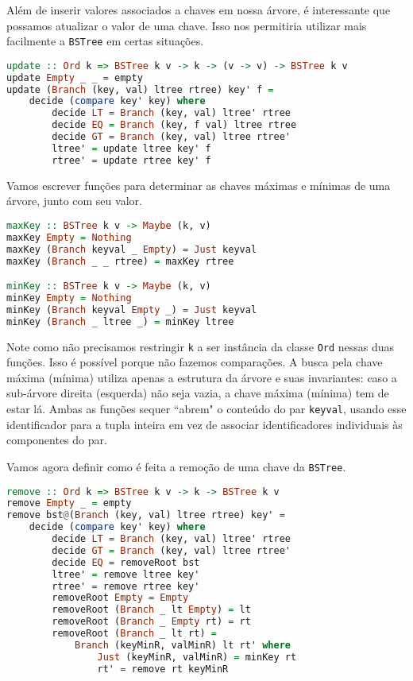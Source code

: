 \documentclass[a4paper]{article}
\begin{document}
Além de inserir valores associados a chaves em nossa árvore, é interessante que possamos atualizar o valor de uma chave.
Isso nos permitiria utilizar mais facilmente a \texttt{BSTree} em certas situações.

\begin{lstlisting}[language=haskell, frame=single]
update :: Ord k => BSTree k v -> k -> (v -> v) -> BSTree k v
update Empty _ _ = empty
update (Branch (key, val) ltree rtree) key' f =
	decide (compare key' key) where
		decide LT = Branch (key, val) ltree' rtree
		decide EQ = Branch (key, f val) ltree rtree
		decide GT = Branch (key, val) ltree rtree'
		ltree' = update ltree key' f
		rtree' = update rtree key' f
\end{lstlisting}

Vamos escrever funções para determinar as chaves máximas e mínimas de uma árvore, junto com seu valor.

\begin{lstlisting}[language=haskell, frame=single]
maxKey :: BSTree k v -> Maybe (k, v)
maxKey Empty = Nothing
maxKey (Branch keyval _ Empty) = Just keyval
maxKey (Branch _ _ rtree) = maxKey rtree

minKey :: BSTree k v -> Maybe (k, v)
minKey Empty = Nothing
minKey (Branch keyval Empty _) = Just keyval
minKey (Branch _ ltree _) = minKey ltree
\end{lstlisting}

Note como não precisamos restringir \texttt{k} a ser instância da classe \texttt{Ord} nessas duas funções.
Isso é possível porque não fazemos comparações.
A busca pela chave máxima (mínima) utiliza apenas a estrutura da árvore e suas invariantes: caso a sub-árvore direita (esquerda) não seja vazia, a chave máxima (mínima) tem de estar lá.
Ambas as funções sequer ``abrem" o conteúdo do par \texttt{keyval}, usando esse identificador para a tupla inteira em vez de associar identificadores individuais às componentes do par.

Vamos agora definir como é feita a remoção de uma chave da \texttt{BSTree}.

\pagebreak

\begin{lstlisting}[language=haskell, frame=single]
remove :: Ord k => BSTree k v -> k -> BSTree k v
remove Empty _ = empty
remove bst@(Branch (key, val) ltree rtree) key' =
	decide (compare key' key) where
		decide LT = Branch (key, val) ltree' rtree
		decide GT = Branch (key, val) ltree rtree'
		decide EQ = removeRoot bst
		ltree' = remove ltree key'
		rtree' = remove rtree key'
		removeRoot Empty = Empty
		removeRoot (Branch _ lt Empty) = lt
		removeRoot (Branch _ Empty rt) = rt
		removeRoot (Branch _ lt rt) =
			Branch (keyMinR, valMinR) lt rt' where
				Just (keyMinR, valMinR) = minKey rt
				rt' = remove rt keyMinR
\end{lstlisting}
\end{document}
